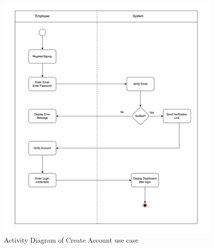 \begin{figure}[h!t]
    \centering
    \includegraphics[width=\textwidth]{images/activityCreateAccount.png}
    \caption{Activity Diagram of Create Account use case}
    \label{fig:activityCreateAccount}
\end{figure}




